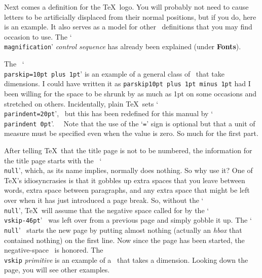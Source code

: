 Next comes a definition for the \TeX\ logo. You will probably not need to
cause letters to be artificially displaced from their normal positions,
but if you do, here is an example.  It also serves as a model for other
\cs\/\ definitions that you may find occasion to use.  The `{\tt
\\magnification}' {\sl control sequence} has already been explained (under {\bf Fonts}).

The \cs\/\ `{\tt \\parskip=10pt plus 1pt}' is an example of a general class
of \css\/\ that take dimensions.
I could have written it as
{\tt parskip10pt plus 1pt minus 1pt} had I been willing for the space to
be shrunk by as much as 1pt on some occasions and stretched on others.
Incidentally, plain \TeX\ sets
`{\tt \\parindent=20pt}', \ but this has been redefined for this manual by
`{\tt \\parindent 0pt}'. \ \ Note that the use of the `{\tt =}' sign is optional but that
a unit of measure must be specified even when the value is zero.
So much for the first part.

After telling \TeX\ that the title page is not to be numbered, the
information for the title page starts with the \cs\/\ `{\tt \\null}',
which, as its name implies, normally does nothing.  So why use it?  One of
\TeX's idiosyncrasies is that it gobbles up extra spaces that you leave
between words, extra space between paragraphs, and any extra space that
might be left over when it has just introduced a page break.  So, without
the `{\tt \\null}', \TeX\ will assume that the negative space called for by
the `{\tt \\vskip-46pt}' \cs\/\ was left over from a previous page and
simply gobble it up.  The `{\tt \\null}' \cs\/\ starts the new page by
putting almost nothing (actually an {\sl hbox} that contained nothing) on
the first line.  Now since the page has been started, the negative-space
\cs\/\ is honored.  The {\tt \\vskip} {\sl primitive} is an example of a
\cs\/\ that takes a dimension.  Looking down the page, you will see other
examples.

